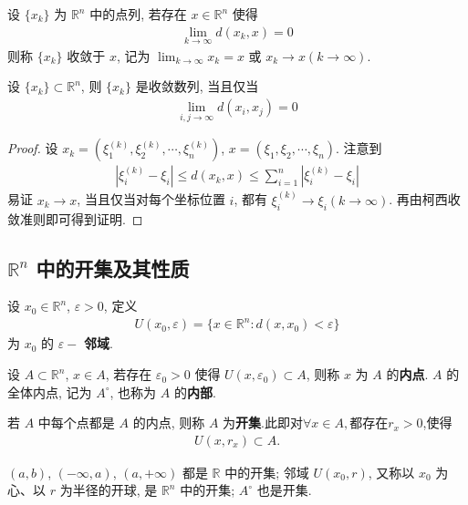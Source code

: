 \documentclass[../../main.tex]{subfiles}
\begin{document}
\begin{definition}
设 $\{x_k\}$ 为 $\mathbb{R}^n$ 中的点列, 若存在 $x \in \mathbb{R}^n$ 使得
\begin{align*}
\lim_{k \to \infty} d(x_k, x) = 0
\end{align*}
则称 $\{x_k\}$ 收敛于 $x$, 记为 $\lim_{k \to \infty} x_k = x$ 或 $x_k \to x (k \to \infty)$.
\end{definition}

\begin{proposition}
设 $\{x_k\} \subset \mathbb{R}^n$, 则 $\{x_k\}$ 是收敛数列, 当且仅当
\begin{align*}
\lim_{i, j \to \infty} d(x_i, x_j) = 0
\end{align*} 
\end{proposition}
\begin{proof}
设 $x_k = (\xi_1^{(k)}, \xi_2^{(k)}, \cdots, \xi_n^{(k)})$, $x = (\xi_1, \xi_2, \cdots, \xi_n)$. 注意到
\begin{align*}
|\xi_i^{(k)} - \xi_i| \leqslant d(x_k, x) \leqslant \sum_{i = 1}^{n}|\xi_i^{(k)} - \xi_i|
\end{align*}
易证 $x_k \to x$, 当且仅当对每个坐标位置 $i$, 都有 $\xi_i^{(k)} \to \xi_i (k \to \infty)$. 再由柯西收敛准则即可得到证明.
\end{proof}

\subsection{$\mathbb{R}^n$ 中的开集及其性质} 

\begin{definition}[邻域、内点、内部和开集]
设 $x_0 \in \mathbb{R}^n$, $\varepsilon > 0$, 定义
\begin{align*}
U(x_0, \varepsilon) = \{x \in \mathbb{R}^n : d(x, x_0) < \varepsilon\}
\end{align*}
为 $x_0$ 的 $\varepsilon -$ \textbf{邻域}.

设 $A \subset \mathbb{R}^n$, $x \in A$, 若存在 $\varepsilon_0 > 0$ 使得 $U(x, \varepsilon_0) \subset A$, 则称 $x$ 为 $A$ 的\textbf{内点}. $A$ 的全体内点, 记为 $A^\circ$, 也称为 $A$ 的\textbf{内部}.

若 $A$ 中每个点都是 $A$ 的内点, 则称 $A$ 为\textbf{开集}.此即对$\forall x\in A,$都存在$r_x>0$,使得
\begin{align*}
U(x,r_x)\subset A.
\end{align*}
\end{definition}
\begin{note}
$(a, b)$, $(-\infty, a)$, $(a, +\infty)$ 都是 $\mathbb{R}$ 中的开集; 邻域 $U(x_0, r)$, 又称以 $x_0$ 为心、以 $r$ 为半径的开球, 是 $\mathbb{R}^n$ 中的开集; $A^\circ$ 也是开集.
\end{note}
\end{document}
